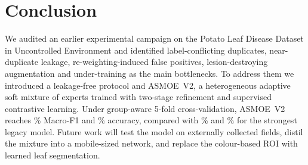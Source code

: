 \section{Conclusion}\label{sec:conclusion}

We audited an earlier experimental campaign on the Potato Leaf Disease Dataset in Uncontrolled
Environment and identified label-conflicting duplicates, near-duplicate leakage,
re-weighting-induced false positives, lesion-destroying augmentation and under-training as the main
bottlenecks. To address them we introduced a leakage-free protocol and ASMOE~V2, a heterogeneous
adaptive soft mixture of experts trained with two-stage refinement and supervised contrastive
learning. Under group-aware 5-fold cross-validation, ASMOE~V2 reaches \VtwoFOne\% Macro-F1 and
\VtwoAcc\% accuracy, compared with \BaseFOne\% and \BaseAcc\% for the strongest legacy model. Future
work will test the model on externally collected fields, distil the mixture into a mobile-sized
network, and replace the colour-based ROI with learned leaf segmentation.
